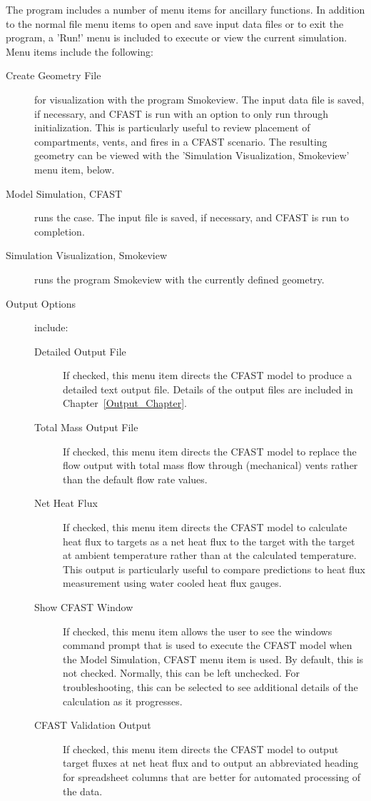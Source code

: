 The program includes a number of menu items for ancillary functions.  In addition to the normal file menu items to open and save input data files or to exit the program, a 'Run!' menu is included to execute or view the current simulation. Menu items include the following:
\begin{description}
\item[Create Geometry File] for visualization with the program Smokeview.  The input data file is saved, if necessary, and CFAST is run with an option to only run through initialization. This is particularly useful to review placement of compartments, vents, and fires in a CFAST scenario. The resulting geometry can be viewed with the 'Simulation Visualization, Smokeview' menu item, below.
\item[Model Simulation, CFAST] runs the case. The input file is saved, if necessary, and CFAST is run to completion. 
\item[Simulation Visualization, Smokeview] runs the program Smokeview with the currently defined geometry. 
\item[Output Options] include:
\begin{description}
\item[Detailed Output File] If checked, this menu item directs the CFAST model to produce a detailed text output file.  Details of the output files are included in Chapter~\ref{Output_Chapter}.
\item[Total Mass Output File] If checked, this menu item directs the CFAST model to replace the flow output with total mass flow through (mechanical) vents rather than the default flow rate values.
\item[Net Heat Flux]  If checked, this menu item directs the CFAST model to calculate heat flux to targets as a net heat flux to the target with the target at ambient temperature rather than at the calculated temperature.  This output is particularly useful to compare predictions to heat flux measurement using water cooled heat flux gauges.
\item[Show CFAST Window] If checked, this menu item allows the user to see the windows command prompt that is used to execute the CFAST model when the Model Simulation, CFAST menu item is used.  By default, this is not checked.  Normally, this can be left unchecked.  For troubleshooting, this can be selected to see additional details of the calculation as it progresses.
\item[CFAST Validation Output] If checked, this menu item directs the CFAST model to output target fluxes at net heat flux and to output an abbreviated heading for spreadsheet columns that are better for automated processing of the data.
\end{description}
\end{description}


